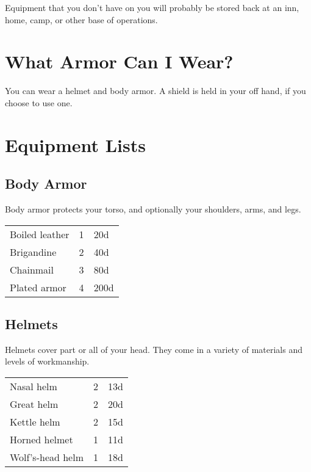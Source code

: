 Equipment that you don't have on you will probably be stored
back at an inn, home, camp, or other base of operations.

\section{What Armor Can I Wear?}

You can wear a helmet and body armor. A shield is held in your
off hand, if you choose to use one.

\section{Equipment Lists}

\subsection{Body Armor}

Body armor protects your torso, and optionally your shoulders,
arms, and legs.

\begin{center}
{
\begin{xtabular}{|l|l|l|}
Boiled leather & 1 & 20d \\
Brigandine & 2 & 40d \\
Chainmail & 3 & 80d \\
Plated armor & 4 & 200d \\
\hline
\end{xtabular}
}
\end{center}

\subsection{Helmets}

Helmets cover part or all of your head. They come in a variety
of materials and levels of workmanship.

\begin{center}
{
\begin{xtabular}{|l|l|l|}
Nasal helm & 2 & 13d \\
Great helm & 2 & 20d \\
Kettle helm & 2 & 15d \\
Horned helmet & 1 & 11d \\
Wolf's-head helm & 1 & 18d \\
\hline
\end{xtabular}
}
\end{center}

